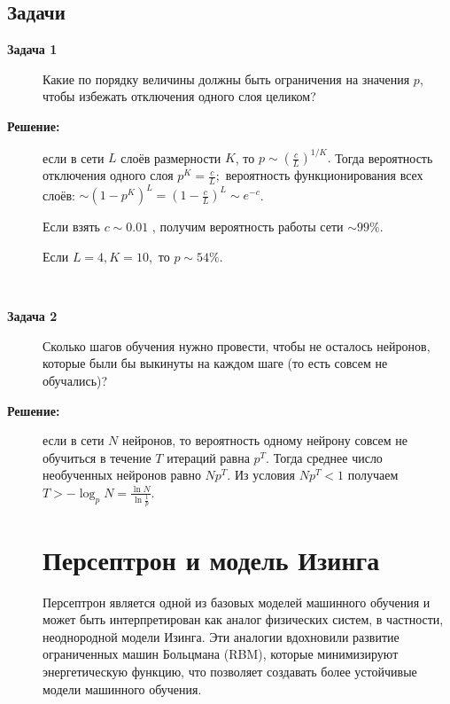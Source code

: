 \subsection{Задачи}
\begin{description}
\item[\textbf{Задача 1}] 
    Какие по порядку величины должны быть ограничения на значения $p$, чтобы избежать отключения одного слоя целиком?
\item[\textbf{Решение:}] если в сети $L$ слоёв размерности $K$, то $p \sim (\frac{c}{L})^{1/K}. $
    Тогда вероятность отключения одного слоя $p^K = \frac{c}{L}; $ вероятность функционирования всех слоёв: $\sim (1-p^K)^L = (1-\frac{c}{L})^L \sim e^{-c}$.
    
    Если взять $c\sim 0.01$ , получим вероятность работы сети $\sim 99\%$.
    
    Если $L=4, K=10,$ то $p \sim 54\%$.

\

\item[\textbf{Задача 2}] 
    Сколько шагов обучения нужно провести, чтобы не осталось нейронов, которые были бы выкинуты на каждом шаге (то есть совсем не обучались)?

\item[\textbf{Решение:}] если в сети $N$ нейронов, то вероятность одному нейрону совсем не обучиться в течение $T$ итераций равна $p^T$. Тогда среднее число необученных нейронов равно $Np^T$. Из условия $Np^T<1$ получаем $T>-\log_{p}N = \frac{\ln N}{\ln \frac{1}{p}}$.



\section{Персептрон и модель Изинга}

Персептрон является одной из базовых моделей машинного обучения и может быть интерпретирован как аналог физических систем, в частности, неоднородной модели Изинга. 
Эти аналогии вдохновили развитие ограниченных машин Больцмана (RBM), которые минимизируют энергетическую функцию, что позволяет создавать более устойчивые модели машинного обучения.  


\end{description}
